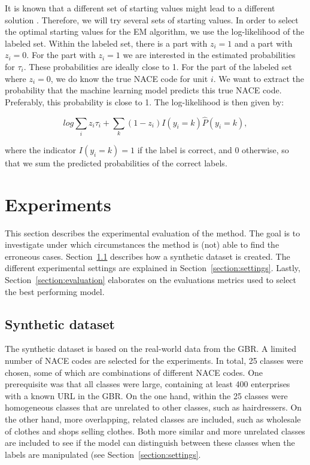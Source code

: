 \documentclass[12pt, a4paper, titlepage]{article}
\begin{document}


It is known that a different set of starting values might lead to a different solution \citep{Shireman}. Therefore, we will try several sets of starting values. In order to select the optimal starting values for the EM algorithm, we use the log-likelihood of the labeled set. Within the labeled set, there is a part with $z_i = 1$ and a part with $z_i = 0$. For the part with $z_i = 1$ we are interested in the estimated probabilities for $\tau_i$. These probabilities are ideally close to 1. For the part of the labeled set where $z_i = 0$, we do know the true NACE code for unit $i$. We want to extract the probability that the machine learning model predicts this true NACE code. Preferably, this probability is close to 1.
The log-likelihood is then given by:

						\begin{equation}\label{log}
log \sum_i z_i \tau_i + \sum_k (1-z_i)I(y_i = k)\hat{P}(y_i=k),
						\end{equation}
						

where the indicator $I(y_i = k) = 1$ if the label is correct, and $0$ otherwise, so that we sum the predicted probabilities of the correct labels.


							\section{Experiments}
							\label{section:experiments}

This section describes the experimental evaluation of the method. The goal is to investigate under which circumstances the method is (not) able to find the erroneous cases. Section~\ref{section:synthdata} describes how a synthetic dataset is created. The different experimental settings are explained in Section~\ref{section:settings}. Lastly, Section~\ref{section:evaluation} elaborates on the evaluations metrics used to select the best performing model.

					\subsection{Synthetic dataset}
					\label{section:synthdata}
The synthetic dataset is based on the real-world data from the GBR. A limited number of NACE codes are selected for the experiments. In total, 25 classes were chosen, some of which are combinations of different NACE codes. One prerequisite was that all classes were large, containing at least 400 enterprises with a known URL in the GBR. On the one hand, within the 25 classes were homogeneous classes that are unrelated to other classes, such as hairdressers. On the other hand, more overlapping, related classes are included, such as wholesale of clothes and shops selling clothes. Both more similar and more unrelated classes are included to see if the model can distinguish between these classes when the labels are manipulated (see Section~\ref{section:settings}.
\end{document}
